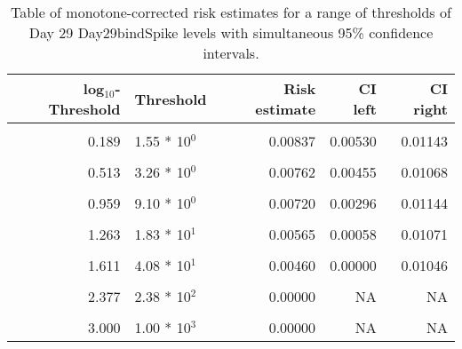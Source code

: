 \documentclass[]{article}
\begin{document}
\begin{table}[!h]

\caption{\label{tab:unnamed-chunk-71}Table of monotone-corrected risk estimates for a range of thresholds of Day 29 Day29bindSpike levels with simultaneous 95\% confidence intervals.}
\centering
\begin{tabular}[t]{rlrrr}
\toprule
log$_{10}$-Threshold & Threshold & Risk estimate & CI left & CI right\\
\midrule
\cellcolor{gray!6}{-0.813} & \cellcolor{gray!6}{1.54 * 10$^{1}$} & \cellcolor{gray!6}{0.00878} & \cellcolor{gray!6}{0.00590} & \cellcolor{gray!6}{0.01166}\\
0.189 & 1.55 * 10$^{0}$ & 0.00837 & 0.00530 & 0.01143\\
\cellcolor{gray!6}{0.341} & \cellcolor{gray!6}{2.19 * 10$^{0}$} & \cellcolor{gray!6}{0.00820} & \cellcolor{gray!6}{0.00514} & \cellcolor{gray!6}{0.01125}\\
0.513 & 3.26 * 10$^{0}$ & 0.00762 & 0.00455 & 0.01068\\
\cellcolor{gray!6}{0.792} & \cellcolor{gray!6}{6.19 * 10$^{0}$} & \cellcolor{gray!6}{0.00749} & \cellcolor{gray!6}{0.00402} & \cellcolor{gray!6}{0.01096}\\
0.959 & 9.10 * 10$^{0}$ & 0.00720 & 0.00296 & 0.01144\\
\cellcolor{gray!6}{1.113} & \cellcolor{gray!6}{1.30 * 10$^{1}$} & \cellcolor{gray!6}{0.00639} & \cellcolor{gray!6}{0.00152} & \cellcolor{gray!6}{0.01126}\\
1.263 & 1.83 * 10$^{1}$ & 0.00565 & 0.00058 & 0.01071\\
\cellcolor{gray!6}{1.491} & \cellcolor{gray!6}{3.10 * 10$^{1}$} & \cellcolor{gray!6}{0.00460} & \cellcolor{gray!6}{0.00000} & \cellcolor{gray!6}{0.00970}\\
1.611 & 4.08 * 10$^{1}$ & 0.00460 & 0.00000 & 0.01046\\
\cellcolor{gray!6}{1.729} & \cellcolor{gray!6}{5.36 * 10$^{1}$} & \cellcolor{gray!6}{0.00397} & \cellcolor{gray!6}{0.00000} & \cellcolor{gray!6}{0.00866}\\
2.377 & 2.38 * 10$^{2}$ & 0.00000 & NA & NA\\
\cellcolor{gray!6}{2.699} & \cellcolor{gray!6}{5.00 * 10$^{2}$} & \cellcolor{gray!6}{0.00000} & \cellcolor{gray!6}{NA} & \cellcolor{gray!6}{NA}\\
3.000 & 1.00 * 10$^{3}$ & 0.00000 & NA & NA\\
\bottomrule
\end{tabular}
\end{table}
\end{document}
